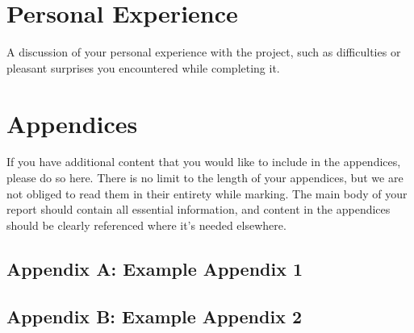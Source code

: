 \documentclass{article}
\begin{document}
\section{Personal Experience}

A discussion of your personal experience with the project, such as difficulties or pleasant surprises you encountered while completing it.

\small



\normalsize
\newpage
\section*{Appendices}
If you have additional content that you would like to include in the appendices, please do so here.
There is no limit to the length of your appendices, but we are not obliged to read them in their entirety while marking. The main body of your report should contain all essential information, and content in the appendices should be clearly referenced where it's needed elsewhere.
\subsection*{Appendix A: Example Appendix 1}
\subsection*{Appendix B: Example Appendix 2}
\end{document}
